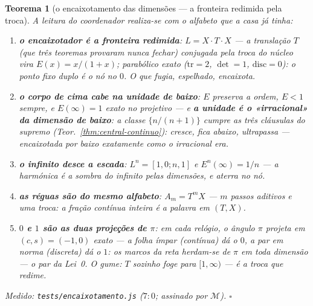 \documentclass[11pt,a4paper]{article}
\newtheorem{teorema}{Teorema}
\newcommand{\code}[1]{\texttt{\small #1}}
\begin{document}
\begin{teorema}[o encaixotamento das dimensões --- a fronteira
redimida pela troca]\label{thm:encaixotamento}
A leitura do coordenador realiza-se com o alfabeto que a casa já
tinha:
\begin{enumerate}
\item \textbf{o encaixotador é a fronteira redimida}:
$L=X\cdot T\cdot X$ --- a translação $T$ (que três teoremas provaram
nunca fechar) \emph{conjugada pela troca do núcleo} vira
$E(x)=x/(1{+}x)$; parabólico exato ($\mathrm{tr}=2$, $\det=1$,
$\mathrm{disc}=0$): o ponto fixo duplo é \emph{o nó no $0$}. O que
fugia, espelhado, encaixota.
\item \textbf{o corpo de cima cabe na unidade de baixo}: $E$
preserva a ordem, $E<1$ sempre, e $E(\infty)=1$ exato no projetivo
--- e \textbf{a unidade é o «irracional» da dimensão de baixo}: a
classe $\{n/(n{+}1)\}$ cumpre as três cláusulas do supremo
(Teor.~\ref{thm:central-continuo}): cresce, fica abaixo, ultrapassa
--- encaixotada por baixo exatamente como o irracional era.
\item \textbf{o infinito desce a escada}: $L^{n}=[1,0;n,1]$ e
$E^{n}(\infty)=1/n$ --- \emph{a harmónica é a sombra do infinito
pelas dimensões}, e aterra no nó.
\item \textbf{as réguas são do mesmo alfabeto}: $A_{m}=T^{m}X$ ---
$m$ passos aditivos e uma troca: a fração contínua inteira é a palavra
em $(T,X)$.
\item \textbf{$0$ e $1$ são as duas projeções de $\pi$}: em cada
relógio, o ângulo $\pi$ projeta em $(c,s)=(-1,0)$ exato --- a folha
ímpar (contínua) dá o $0$, a par em norma (discreta) dá o $1$: os
marcos da reta herdam-se de $\pi$ em toda dimensão --- o par da
Lei~0. O gume: $T$ sozinho foge para $[1,\infty)$ --- é a troca que
redime.
\end{enumerate}
\emph{Medido:} \code{tests/encaixotamento.js} ($7{:}0$; assinado por
$\mathcal{M}$).
$\square$
\end{teorema}
\end{document}
